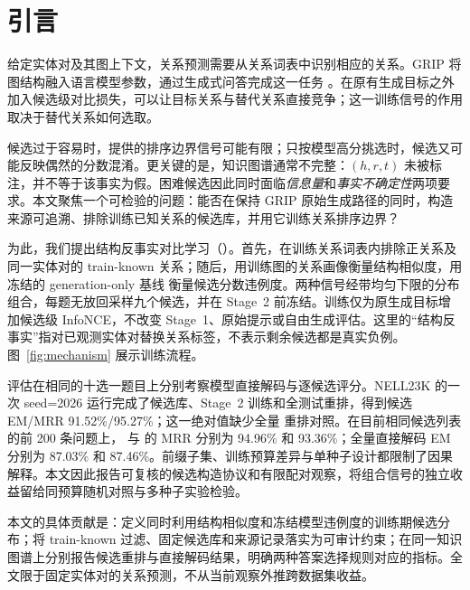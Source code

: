 \section{引言}

给定实体对及其图上下文，关系预测需要从关系词表中识别相应的关系。GRIP 将图结构融入语言模型参数，通过生成式问答完成这一任务 \citep{feng2025grip}。在原有生成目标之外加入候选级对比损失，可以让目标关系与替代关系直接竞争；这一训练信号的作用取决于替代关系如何选取。

候选过于容易时，提供的排序边界信号可能有限；只按模型高分挑选时，候选又可能反映偶然的分数混淆。更关键的是，知识图谱通常不完整：$(h,r,t)$ 未被标注，并不等于该事实为假。困难候选因此同时面临\emph{信息量}和\emph{事实不确定性}两项要求。本文聚焦一个可检验的问题：能否在保持 GRIP 原始生成路径的同时，构造来源可追溯、排除训练已知关系的候选库，并用它训练关系排序边界？

为此，我们提出结构反事实对比学习（\scc）。首先，在训练关系词表内排除正关系及同一实体对的 train-known 关系；随后，用训练图的关系画像衡量结构相似度，用冻结的 generation-only 基线 \bone{} 衡量候选分数违例度。两种信号经带均匀下限的分布组合，每题无放回采样九个候选，并在 Stage~2 前冻结。训练仅为原生成目标增加候选级 InfoNCE，不改变 Stage~1、原始提示或自由生成评估。这里的“结构反事实”指对已观测实体对替换关系标签，不表示剩余候选都是真实负例。图~\ref{fig:mechanism} 展示训练流程。

评估在相同的十选一题目上分别考察模型直接解码与逐候选评分。NELL23K 的一次 seed=2026 运行完成了候选库、Stage~2 训练和全测试重排，得到候选 EM/MRR 91.52\%/95.27\%；这一绝对值缺少全量 \bone{} 重排对照。在目前相同候选列表的前 200 条问题上，\scc{} 与 \bone{} 的 MRR 分别为 94.96\% 和 93.36\%；全量直接解码 EM 分别为 87.03\% 和 87.46\%。前缀子集、训练预算差异与单种子设计都限制了因果解释。本文因此报告可复核的候选构造协议和有限配对观察，将组合信号的独立收益留给同预算随机对照与多种子实验检验。

本文的具体贡献是：定义同时利用结构相似度和冻结模型违例度的训练期候选分布；将 train-known 过滤、固定候选库和来源记录落实为可审计约束；在同一知识图谱上分别报告候选重排与直接解码结果，明确两种答案选择规则对应的指标。全文限于固定实体对的关系预测，不从当前观察外推跨数据集收益。
